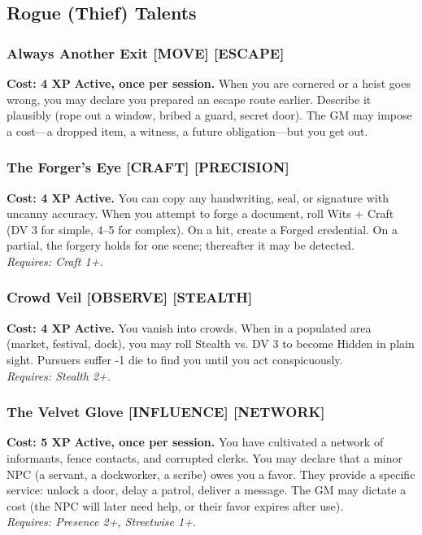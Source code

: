 \subsection*{Rogue (Thief) Talents}
\label{sec:major-rogue}

\subsubsection*{Always Another Exit \textnormal{[MOVE] [ESCAPE]}}
\label{talent:always-another-exit}
\textbf{Cost: 4 XP} \textbf{Active, once per session.} When you are cornered or a heist goes wrong, you may declare you prepared an escape route earlier. Describe it plausibly (rope out a window, bribed a guard, secret door). The GM may impose a cost---a dropped item, a witness, a future obligation---but you get out.

\subsubsection*{The Forger's Eye \textnormal{[CRAFT] [PRECISION]}}
\label{talent:forgers-eye}
\textbf{Cost: 4 XP} \textbf{Active.} You can copy any handwriting, seal, or signature with uncanny accuracy. When you attempt to forge a document, roll Wits + Craft (DV 3 for simple, 4--5 for complex). On a hit, create a Forged credential. On a partial, the forgery holds for one scene; thereafter it may be detected. \\
\textit{Requires: Craft 1+.}

\subsubsection*{Crowd Veil \textnormal{[OBSERVE] [STEALTH]}}
\label{talent:crowd-veil}
\textbf{Cost: 4 XP} \textbf{Active.} You vanish into crowds. When in a populated area (market, festival, dock), you may roll Stealth vs. DV 3 to become Hidden in plain sight. Pursuers suffer -1 die to find you until you act conspicuously. \\
\textit{Requires: Stealth 2+.}

\subsubsection*{The Velvet Glove \textnormal{[INFLUENCE] [NETWORK]}}
\label{talent:velvet-glove}
\textbf{Cost: 5 XP} \textbf{Active, once per session.} You have cultivated a network of informants, fence contacts, and corrupted clerks. You may declare that a minor NPC (a servant, a dockworker, a scribe) owes you a favor. They provide a specific service: unlock a door, delay a patrol, deliver a message. The GM may dictate a cost (the NPC will later need help, or their favor expires after use). \\
\textit{Requires: Presence 2+, Streetwise 1+.}

